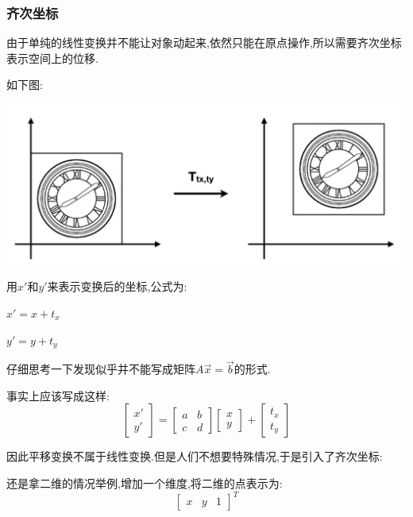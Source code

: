 {{    \subsubsection{齐次坐标}{
      由于单纯的线性变换并不能让对象动起来,依然只能在原点操作,所以需要齐次坐标表示空间上的位移.

      如下图:

      \includegraphics[scale=0.25]{resources/homogeneous_coordinates.png}

      用$x\prime$和$y\prime$来表示变换后的坐标,公式为:

      $x\prime = x + t_x$

      $y\prime = y + t_y$

      仔细思考一下发现似乎并不能写成矩阵$A\vec{x} = \vec{b}$的形式.

      事实上应该写成这样:
      $$
        \begin{bmatrix}
          x\prime \\
          y\prime
        \end{bmatrix}
        =
        \begin{bmatrix}
          a & b \\
          c & d
        \end{bmatrix}
        \begin{bmatrix}
          x \\
          y
        \end{bmatrix}
        +
        \begin{bmatrix}
          t_x \\
          t_y
        \end{bmatrix}
      $$

      因此平移变换不属于线性变换.但是人们不想要特殊情况,于是引入了齐次坐标:

      还是拿二维的情况举例,增加一个维度,将二维的点表示为:
      $$\begin{bmatrix}
          x & y & 1
        \end{bmatrix}^T$$

}}}
